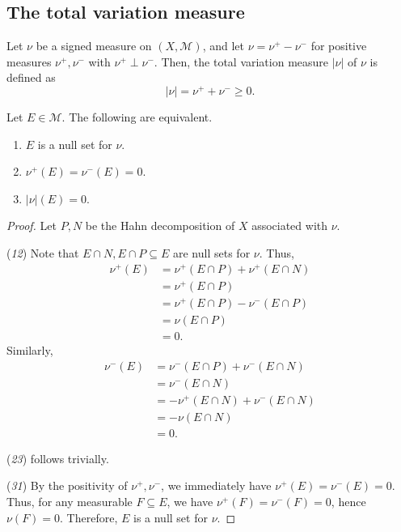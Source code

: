 \documentclass[11pt]{article}
\newcommand{\M}{\mathcal{M}}
\theoremstyle{definition}
\theoremstyle{remark}
\begin{document}
    \subsection{The total variation measure}

    \begin{definition}
        Let $\nu$ be a signed measure on $(X, \M)$, and let $\nu = \nu^+ - \nu^-$
        for positive measures $\nu^+, \nu^-$ with $\nu^+ \perp \nu^-$. Then, the
        total variation measure $|\nu|$ of $\nu$ is defined as \[
            |\nu| = \nu^+ + \nu^- \geq 0.
        \]
    \end{definition}

    \begin{lemma}
        Let $E \in \M$. The following are equivalent. \begin{enumerate}
            \item $E$ is a null set for $\nu$.
            \item $\nu^+(E) = \nu^-(E) = 0$.
            \item $|\nu|(E) = 0$.
        \end{enumerate}
    \end{lemma}
    \begin{proof}
        Let $P, N$ be the Hahn decomposition of $X$ associated with $\nu$.

        (\emph{1}\Rightarrow \emph{2}) Note that $E \cap N, E \cap P \subseteq E$
        are null sets for $\nu$. Thus, \begin{align*}
            \nu^+(E) &= \nu^+(E \cap P) + \nu^+(E \cap N) \\
            &= \nu^+(E \cap P) \\
            &= \nu^+(E \cap P) - \nu^-(E \cap P) \\
            &= \nu(E \cap P) \\
            &= 0.
        \end{align*}
         Similarly, \begin{align*}
            \nu^-(E) &= \nu^-(E \cap P) + \nu^-(E \cap N) \\
            &= \nu^-(E \cap N) \\
            &= -\nu^+(E \cap N) + \nu^-(E \cap N) \\
            &= -\nu(E \cap N) \\
            &= 0.
        \end{align*}

        (\emph{2}\Rightarrow \emph{3}) follows trivially.

        (\emph{3}\Rightarrow \emph{1}) By the positivity of $\nu^+, \nu^-$, we
        immediately have $\nu^+(E) = \nu^-(E) = 0$. Thus, for any measurable $F
        \subseteq E$, we have $\nu^+(F) = \nu^-(F) = 0$, hence $\nu(F) = 0$.
        Therefore, $E$ is a null set for $\nu$.
    \end{proof}
\end{document}

